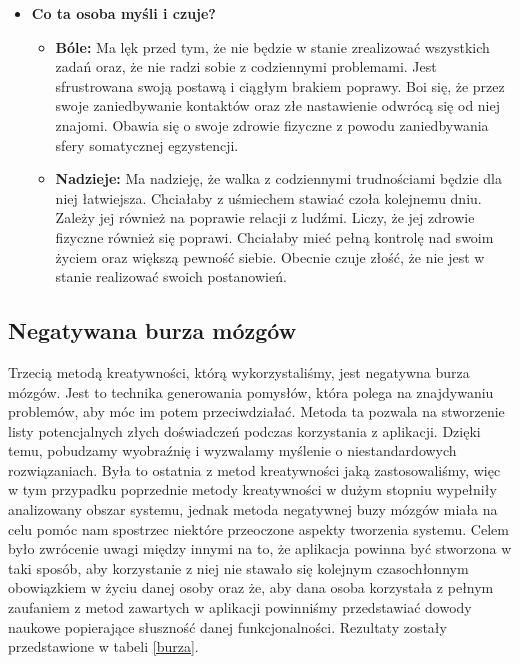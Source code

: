 \begin{itemize}
    \item \textbf{Co ta osoba myśli i czuje?}
          \begin{itemize}
              \item \textbf{Bóle:} Ma lęk przed tym, że nie będzie w stanie
                    zrealizować wszystkich zadań oraz, że nie radzi sobie z
                    codziennymi problemami. Jest sfrustrowana swoją postawą i
                    ciągłym brakiem poprawy. Boi się, że przez swoje
                    zaniedbywanie kontaktów oraz złe nastawienie odwrócą się od
                    niej znajomi. Obawia się o swoje zdrowie fizyczne z powodu
                    zaniedbywania sfery somatycznej egzystencji.
              \item \textbf{Nadzieje:}  Ma nadzieję, że walka z codziennymi
                    trudnościami będzie dla niej łatwiejsza. Chciałaby z
                    uśmiechem stawiać czoła kolejnemu dniu. Zależy jej również
                    na poprawie relacji z ludźmi. Liczy, że jej zdrowie fizyczne
                    również się poprawi. Chciałaby mieć pełną kontrolę nad swoim
                    życiem oraz większą pewność siebie. Obecnie czuje złość, że
                    nie jest w stanie realizować swoich postanowień.
          \end{itemize}
\end{itemize}

\subsection{Negatywana burza mózgów}

Trzecią metodą kreatywności, którą wykorzystaliśmy, jest negatywna burza mózgów.
Jest to technika generowania pomysłów, która polega na znajdywaniu problemów,
aby móc im potem przeciwdziałać. Metoda ta pozwala na stworzenie listy
potencjalnych złych doświadczeń podczas korzystania z aplikacji. Dzięki temu,
pobudzamy wyobraźnię i wyzwalamy myślenie o niestandardowych rozwiązaniach. Była
to ostatnia z metod kreatywności jaką zastosowaliśmy, więc w tym przypadku
poprzednie metody kreatywności w dużym stopniu wypełniły analizowany obszar
systemu, jednak metoda negatywnej buzy mózgów miała na celu pomóc nam spostrzec
niektóre przeoczone aspekty tworzenia systemu. Celem było zwrócenie uwagi między
innymi na to, że aplikacja powinna być stworzona w taki sposób, aby korzystanie
z niej nie stawało się kolejnym czasochłonnym obowiązkiem w życiu danej osoby
oraz że, aby dana osoba korzystała z pełnym zaufaniem z metod zawartych w
aplikacji powinniśmy przedstawiać dowody naukowe popierające słuszność danej
funkcjonalności. Rezultaty zostały przedstawione w tabeli \ref{burza}.

